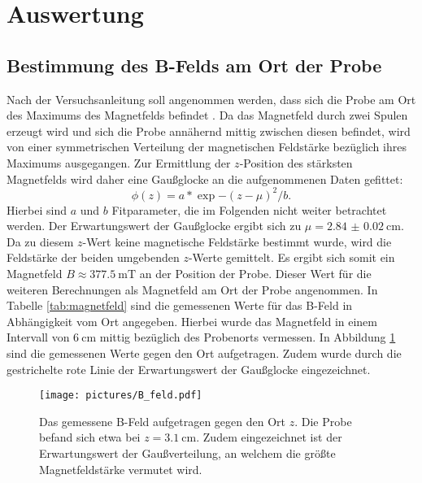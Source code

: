 \section{Auswertung}
\label{sec:Auswertung}
%
\subsection{Bestimmung des B-Felds am Ort der Probe}
Nach der Versuchsanleitung soll angenommen werden, dass sich die Probe am Ort des Maximums des Magnetfelds befindet \cite{Anleitung}.
Da das Magnetfeld durch zwei Spulen erzeugt wird und sich die Probe annähernd mittig zwischen diesen befindet, wird von einer symmetrischen Verteilung der magnetischen Feldstärke bezüglich ihres Maximums ausgegangen. Zur Ermittlung der $z$-Position des stärksten Magnetfelds wird daher eine Gaußglocke an die aufgenommenen Daten gefittet:
\begin{equation}
  \phi(z)=a*\exp{-(z-\mu)^2/b}\mathrm{.}
\end{equation}
Hierbei sind $a$ und $b$ Fitparameter, die im Folgenden nicht weiter betrachtet werden.
Der Erwartungswert der Gaußglocke ergibt sich zu $\mu=\SI{2.84(2)}{\centi\meter}$. Da zu diesem $z$-Wert keine magnetische Feldstärke bestimmt wurde, wird die Feldstärke der beiden umgebenden $z$-Werte gemittelt.
Es ergibt sich somit ein Magnetfeld $B\approx \SI{377.5}{\milli\tesla}$ an der Position der Probe.
Dieser Wert für die weiteren Berechnungen als Magnetfeld am Ort der Probe angenommen.
In Tabelle \ref{tab:magnetfeld} sind die gemessenen Werte für das B-Feld in Abhängigkeit vom Ort angegeben. Hierbei wurde das Magnetfeld in einem Intervall von $\SI{6}{\centi\meter}$ mittig bezüglich des Probenorts vermessen. In Abbildung \ref{fig:magnetfeld} sind die gemessenen Werte gegen den Ort aufgetragen. Zudem wurde durch die gestrichelte rote Linie der Erwartungswert der Gaußglocke eingezeichnet.
\begin{figure}
  \centering
  \texttt{[image: pictures/B\_feld.pdf]}
  \caption{Das gemessene B-Feld aufgetragen gegen den Ort $z$. Die Probe befand sich etwa bei $z=\SI{3.1}{\centi\meter}$. Zudem eingezeichnet ist der Erwartungswert der Gaußverteilung, an welchem die größte Magnetfeldstärke vermutet wird.}
  \label{fig:magnetfeld}
\end{figure}


